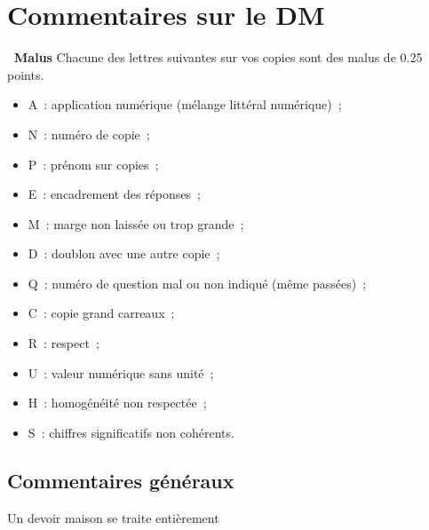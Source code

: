 \documentclass[a4paper, 10pt, final, garamond]{book}
\begin{document}
\setcounter{chapter}{0}

\chapter{Commentaires sur le DM}

\begin{NCprop}[width=\linewidth]{\centering\bfseries\ Malus}
    Chacune des lettres suivantes sur vos copies sont des malus de \num{0.25}
    points.\smallbreak
    \begin{minipage}{0.50\linewidth}
        \begin{itemize}
            \item A~: application numérique (mélange littéral numérique)~;
            \item N~: numéro de copie~;
            \item P~: prénom sur copies~;
            \item E~: encadrement des réponses~;
            \item M~: marge non laissée ou trop grande~;
            \item D~: doublon avec une autre copie~;
        \end{itemize}
    \end{minipage}
    \begin{minipage}{0.50\linewidth}
        \begin{itemize}
            \item Q~: numéro de question mal ou non indiqué (même passées)~;
            \item C~: copie grand carreaux~;
            \item R~: respect~;
            \item U~: valeur numérique sans unité~;
            \item H~: homogénéité non respectée~;
            \item S~: chiffres significatifs non cohérents.
        \end{itemize}
    \end{minipage}
\end{NCprop}

\section{Commentaires généraux}
\begin{center}
    \Huge Un devoir maison se traite entièrement
\end{center}
\end{document}

